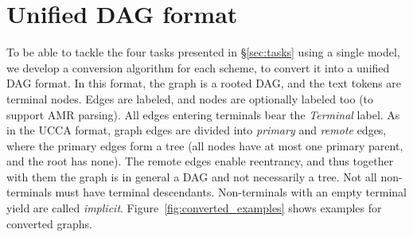 \documentclass[11pt,a4paper]{article}
\begin{document}
\begin{figure*}
\begin{subfigure}[t]{0.5\textwidth}
  \label{fig:converted_example_ud}
\end{subfigure}

\caption{Graphs in unified DAG format.
Pre-terminal nodes are omitted for brevity, except in AMR.}
\label{fig:converted_examples}
\end{figure*}


\section{Unified DAG format}\label{sec:conversion}

To be able to tackle the four tasks presented in \S\ref{sec:tasks} using a single model,
we develop a conversion algorithm for each scheme,
to convert it into a unified DAG format.
In this format, the graph is a rooted DAG, and the text tokens are terminal nodes.
Edges are labeled, and nodes are optionally labeled too (to support AMR parsing).
All edges entering terminals bear the \textit{Terminal} label.
As in the UCCA format,
graph edges are divided into \textit{primary} and \textit{remote} edges,
where the primary edges form a tree (all nodes have at most one primary parent,
and the root has none).
The remote edges enable reentrancy, and thus together with them the graph
is in general a DAG and not necessarily a tree.
Not all non-terminals must have terminal descendants.
Non-terminals with an empty terminal yield are called \textit{implicit}.
Figure~\ref{fig:converted_examples} shows examples for converted graphs.
\end{document}
